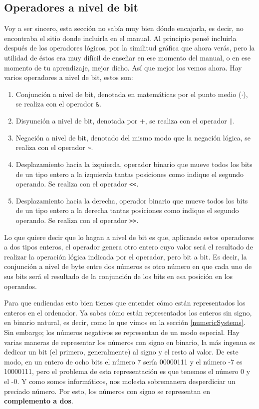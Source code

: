 \documentclass[a4paper]{article}
\begin{document}
\subsection{Operadores a nivel de bit}
Voy a ser sincero, esta sección no sabía muy bien dónde encajarla, es decir,
no encontraba el sitio donde incluirla en el manual.
Al principio pensé incluirla después de los operadores lógicos, por la
similitud gráfica que ahora verás,
pero la utilidad de éstos era muy difícil de enseñar
en ese momento del manual, o en ese momento de tu aprendizaje, mejor dicho.
Así que mejor los vemos ahora.
Hay varios operadores a nivel de bit, estos son:
\begin{enumerate}
\item Conjunción a nivel de bit, denotada en matemáticas por el punto
medio ($\cdot$), se realiza con el operador \verb!&!.
\item Disyunción a nivel de bit, denotada por $+$, se realiza con el operador
\verb!|!.
\item Negación a nivel de bit, denotado del mismo modo que la negación lógica,
se realiza con el operador \verb!~!.
\item Desplazamiento hacia la izquierda, operador binario que mueve todos los
bits de un tipo entero a la izquierda tantas posiciones como indique el segundo
operando. Se realiza con el operador \verb!<<!.
\item Desplazamiento hacia la derecha, operador binario que mueve todos los
bits de un tipo entero a la derecha tantas posiciones como indique el segundo
operando. Se realiza con el operador \verb!>>!.
\end{enumerate}

Lo que quiere decir que lo hagan a nivel de bit es que, aplicando estos
operadores a dos tipos enteros, el operador genera otro entero cuyo valor será
el resultado de realizar la operación lógica indicada por el operador, pero bit
a bit. Es decir, la conjunción a nivel de byte entre dos números es otro número
en que cada uno de sus bits será el resultado de la conjunción
de los bits en esa posición en los operandos.

Para que endiendas esto bien tienes que entender cómo están representados los
enteros en el ordenador. Ya sabes cómo están representados los enteros sin
signo, en binario natural, es decir, como lo que vimos en la sección
\ref{numericSystems}. Sin embargo; los números negativos se representan
de un modo especial.
Hay varias maneras de representar los números con signo
en binario, la más ingenua es dedicar un bit (el primero, generalmente) al signo
y el resto al valor. De este modo, en un entero de ocho bits el número 7 sería
00000111 y el número -7 es 10000111, pero el problema de esta representación
es que tenemos el número 0 y el -0. Y como somos informáticos,
nos molesta sobremanera desperdiciar un preciado número. Por esto,
los números con signo se representan en \textbf{complemento a dos}.
\end{document}
